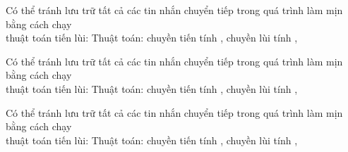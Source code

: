 \documentclass{article}
\begin{document}
\begin{huge}
\vspace{0.2in}

\textwidth
{}


Có thể tránh lưu trữ tất cả các tin nhắn chuyển tiếp trong quá trình làm mịn bằng cách chạy \\
thuật toán tiến lùi:
Thuật toán: chuyền tiến tính , chuyền lùi tính , 

\vspace{0.2in}

\textwidth
{}


Có thể tránh lưu trữ tất cả các tin nhắn chuyển tiếp trong quá trình làm mịn bằng cách chạy \\
thuật toán tiến lùi:
Thuật toán: chuyền tiến tính , chuyền lùi tính , 

\vspace{0.2in}

\textwidth
{}


Có thể tránh lưu trữ tất cả các tin nhắn chuyển tiếp trong quá trình làm mịn bằng cách chạy \\
thuật toán tiến lùi:
Thuật toán: chuyền tiến tính , chuyền lùi tính , 


\end{huge}
\end{document}
